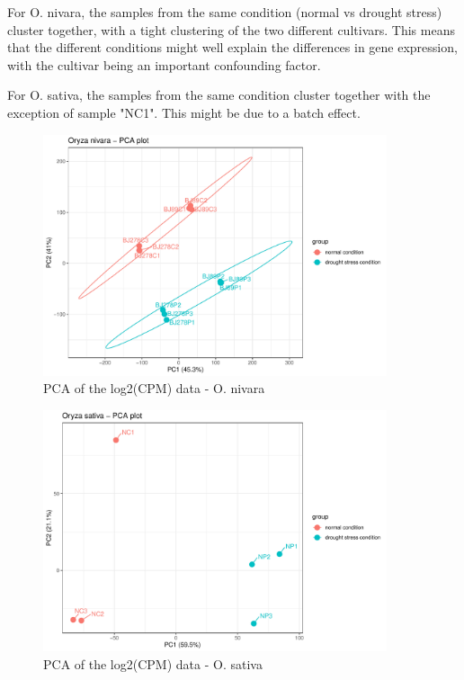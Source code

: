 For O. nivara, the samples from the same condition (normal vs drought stress) cluster together, with a tight clustering of the two different cultivars. This means that the different conditions might well explain the differences in gene expression, with the cultivar being an important confounding factor.

For O. sativa, the samples from the same condition cluster together with the exception of sample "NC1". This might be due to a batch effect.

\begin{figure}[htbp]
    \caption{PCA of the log2(CPM) data - O. nivara}
    \label{fig:3.2-PCA-Oryza_nivara}
    \includegraphics[width=0.9\textwidth]{../../results/plots-and-tables/3.2-PCA-Oryza_nivara}
\end{figure}

\begin{figure}[htbp]
    \caption{PCA of the log2(CPM) data - O. sativa}
    \label{fig:3.2-PCA-Oryza_sativa}
    \includegraphics[width=0.9\textwidth]{../../results/plots-and-tables/3.2-PCA-Oryza_sativa}
\end{figure}


